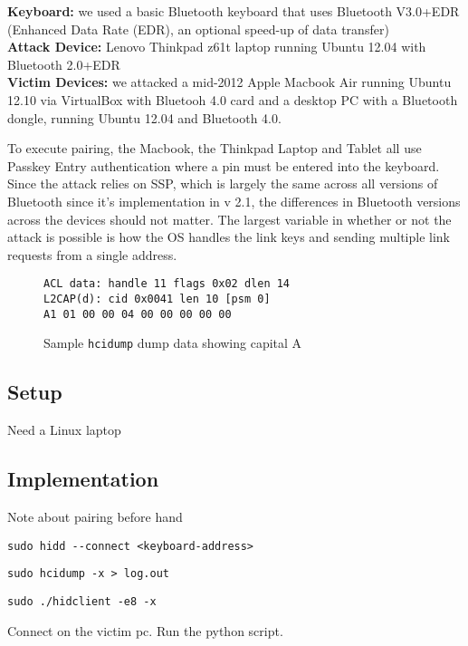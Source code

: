 \documentclass{acm_proc_article-sp}
\begin{document}
\textbf{Keyboard:} we used a basic Bluetooth keyboard that uses Bluetooth V3.0+EDR (Enhanced Data Rate (EDR), an optional speed-up of data transfer)\\
\textbf{Attack Device:} Lenovo Thinkpad z61t laptop running Ubuntu 12.04 with Bluetooth 2.0+EDR\\
\textbf{Victim Devices:} we attacked a mid-2012 Apple Macbook Air running Ubuntu 12.10 via VirtualBox with
Bluetooh 4.0 card and a desktop PC with a Bluetooth dongle, running Ubuntu 12.04 and Bluetooth 4.0.

To execute pairing, the Macbook, the Thinkpad Laptop and Tablet all use Passkey Entry authentication where a pin must be entered into the keyboard. Since the attack relies on SSP, which is largely the same across all versions of Bluetooth since it's implementation in v 2.1, the differences in Bluetooth versions across the devices should not matter. The largest variable in whether or not the attack is possible is how the OS handles the link keys and sending multiple link requests from a single address. 
\begin{figure}
\begin{verbatim}
ACL data: handle 11 flags 0x02 dlen 14
L2CAP(d): cid 0x0041 len 10 [psm 0]
A1 01 00 00 04 00 00 00 00 00
\end{verbatim}
\caption{Sample \texttt{hcidump} dump data showing capital A}
\label{fig:mypic}
\end{figure}


\subsection{Setup}
Need a Linux laptop

\subsection{Implementation}
Note about pairing before hand
\begin{verbatim}
sudo hidd --connect <keyboard-address>
\end{verbatim}

\begin{verbatim}
sudo hcidump -x > log.out
\end{verbatim}

\begin{verbatim}
sudo ./hidclient -e8 -x
\end{verbatim}

Connect on the victim pc.
Run the python script.
\end{document}
